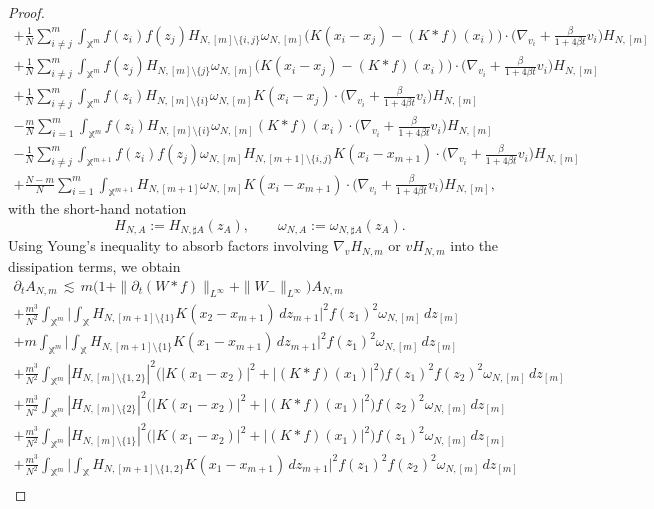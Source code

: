 \documentclass[a4paper,11pt,reqno,noindent]{amsart}
\theoremstyle{plain}
\theoremstyle{definition}
\numberwithin{equation}{section}
\newcommand{\Xd}{\mathbb X}
\begin{document}
\begin{proof}
\begin{multline*}
+\frac1N\sum_{i\ne j}^m\int_{\Xd^m}f(z_i)f(z_j)H_{N,[m]\setminus\{i,j\}}\omega_{N,[m]}\Big(K(x_i-x_j)-(K\ast f)(x_i)\Big)\cdot\Big(\nabla_{v_i}+\frac{\beta}{1+4\beta t}v_i\Big)H_{N,[m]}\\
+\frac1N\sum_{i\ne j}^m\int_{\Xd^m}f(z_j)H_{N,[m]\setminus\{j\}}\omega_{N,[m]}\Big(K(x_i-x_j)-(K\ast f)(x_i)\Big)\cdot\Big(\nabla_{v_i}+\frac{\beta}{1+4\beta t}v_i\Big)H_{N,[m]}\\
+\frac1N\sum_{i\ne j}^m\int_{\Xd^m}f(z_i)H_{N,[m]\setminus\{i\}}\omega_{N,[m]}K(x_i-x_j)\cdot\Big(\nabla_{v_i}+\frac{\beta}{1+4\beta t}v_i\Big)H_{N,[m]}\\
-\frac mN\sum_{i=1}^m\int_{\Xd^m}f(z_i)H_{N,[m]\setminus\{i\}}\omega_{N,[m]}(K\ast f)(x_i)\cdot\Big(\nabla_{v_i}+\frac{\beta}{1+4\beta t}v_i\Big)H_{N,[m]}\\
-\frac{1}N\sum_{i\ne j}^m\int_{\Xd^{m+1}}f(z_i)f(z_j)\omega_{N,[m]} H_{N,[m+1]\setminus\{i,j\}}K(x_i-x_{m+1})\cdot\Big(\nabla_{v_i}+\frac{\beta}{1+4\beta t}v_i\Big)H_{N,[m]}\\
+\frac{N-m}N\sum_{i=1}^m\int_{\Xd^{m+1}} H_{N,[m+1]}\omega_{N,[m]} K(x_i-x_{m+1})\cdot\Big(\nabla_{v_i}+\frac{\beta}{1+4\beta t}v_i\Big)H_{N,[m]},
\end{multline*}
with the short-hand notation
\[H_{N,A}:=H_{N,\sharp A}(z_A),\qquad \omega_{N,A}:=\omega_{N,\sharp A}(z_A).\]
Using Young's inequality to absorb factors involving $\nabla_vH_{N,m}$ or $vH_{N,m}$ into the dissipation terms, we obtain
\begin{multline*}
\partial_tA_{N,m}\,\lesssim\,
m\Big(1+\|\partial_t(W\ast f)\|_{L^\infty}+\|W_-\|_{L^\infty}\Big)A_{N,m}\\
+\frac{m^3}{N^2}\int_{\Xd^{m}}\Big|\int_{\Xd}H_{N,[m+1]\setminus\{1\}}K(x_2-x_{m+1})\,dz_{m+1}\Big|^2f(z_1)^2\omega_{N,[m]}\,dz_{[m]}\\
+m\int_{\Xd^{m}}\Big|\int_{\Xd}H_{N,[m+1]\setminus\{1\}}K(x_1-x_{m+1})\,dz_{m+1}\Big|^2f(z_1)^2\omega_{N,[m]}\,dz_{[m]}\\
+\frac{m^3}{N^2}\int_{\Xd^m}|H_{N,[m]\setminus\{1,2\}}|^2\Big(|K(x_1-x_2)|^2+|(K\ast f)(x_1)|^2\Big)f(z_1)^2f(z_2)^2\omega_{N,[m]}\,dz_{[m]}\\
+\frac{m^3}{N^2}\int_{\Xd^m}|H_{N,[m]\setminus\{2\}}|^2\Big(|K(x_1-x_2)|^2+|(K\ast f)(x_1)|^2\Big)f(z_2)^2\omega_{N,[m]}\,dz_{[m]}\\
+\frac{m^3}{N^2}\int_{\Xd^m}|H_{N,[m]\setminus\{1\}}|^2\Big(|K(x_1-x_2)|^2+|(K\ast f)(x_1)|^2\Big)f(z_1)^2\omega_{N,[m]}\,dz_{[m]}\\
+\frac{m^3}{N^2}\int_{\Xd^{m}}\Big|\int_{\Xd}H_{N,[m+1]\setminus\{1,2\}}K(x_1-x_{m+1})\,dz_{m+1}\Big|^2f(z_1)^2f(z_2)^2\omega_{N,[m]}\,dz_{[m]}\\

\end{multline*}
\end{proof}
\end{document}
